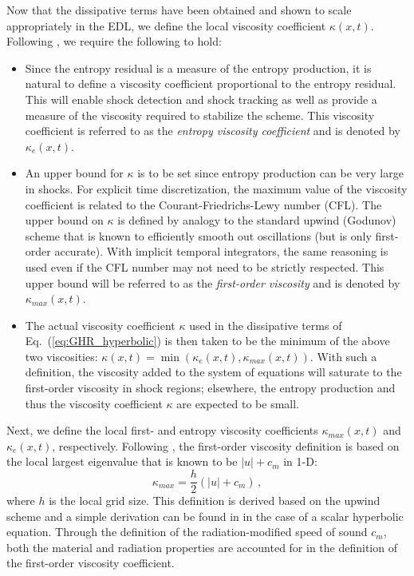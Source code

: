 \documentclass[review]{elsarticle}
\newcommand{\eqt}[1]{Eq.~(\ref{#1})}                     %
\begin{document}
Now that the dissipative terms have been obtained and shown to scale appropriately in the EDL, we define the local viscosity coefficient $\kappa(x,t)$. Following \cite{jlg1, jlg2}, we require the following to hold:
\begin{itemize}
\item Since the entropy residual is a measure of the entropy production, it is natural to define a viscosity coefficient proportional to the entropy residual. This will enable shock detection and shock tracking as well as provide a measure of the viscosity required to stabilize the scheme. This viscosity coefficient is referred to as the \emph{entropy viscosity coefficient} and is denoted by $\kappa_e(x,t)$.
\item An upper bound for $\kappa$ is to be set since entropy production can be very large in shocks. For explicit time discretization, the maximum value of the viscosity coefficient is related to the Courant-Friedrichs-Lewy number (CFL). The upper bound on  $\kappa$  is defined by analogy to the standard upwind (Godunov) scheme that is known to efficiently smooth out oscillations (but is only first-order accurate). With implicit temporal integrators, the same reasoning is used even if the CFL number may not need to be strictly respected. This upper bound will be referred to as the \emph{first-order viscosity} and is denoted by $\kappa_{max}(x,t)$.  
\item The actual viscosity coefficient $\kappa$ used in the dissipative terms of \eqt{eq:GHR_hyperbolic} is then taken to be the minimum of the above two viscosities:  $\kappa(x,t) = \min ( \kappa_e(x,t), \kappa_{max}(x,t) )$. With such a definition, the viscosity added to the system of equations will saturate to the first-order viscosity in shock regions; elsewhere, the entropy production and thus the viscosity coefficient $\kappa$ are expected to be small.
\end{itemize}

Next, we define the local first- and entropy viscosity coefficients $\kappa_{max}(x,t)$ and $\kappa_e(x,t)$, respectively. Following \cite{valentin}, the first-order viscosity definition is based on the local largest eigenvalue that is known to be $|u| + c_m$ in 1-D:
\begin{equation}
\label{eq:equation8}
\kappa_{max} = \frac{h}{2} \left( |u| + c_m \right) \,,
\end{equation}  
where $h$ is the local grid size. This definition is derived based on the upwind scheme and a simple derivation can be found in \cite{jlg1} in the case of a scalar hyperbolic equation. Through the definition of the radiation-modified speed of sound $c_m$, both the material and radiation properties are accounted for in the definition of the first-order viscosity coefficient.
\end{document}

